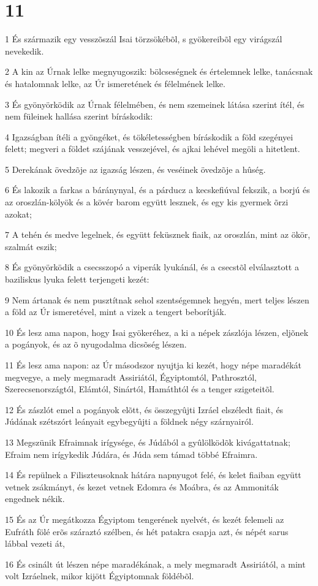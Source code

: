 \chapter{11}

\par 1 És származik egy vesszõszál Isai törzsökébõl, s gyökereibõl egy virágszál nevekedik.
\par 2 A kin az Úrnak lelke megnyugoszik: bölcseségnek és értelemnek lelke, tanácsnak és hatalomnak lelke, az Úr ismeretének és félelmének lelke.
\par 3 És gyönyörködik az Úrnak félelmében, és nem szemeinek látása szerint ítél, és nem füleinek hallása szerint bíráskodik:
\par 4 Igazságban ítéli a gyöngéket, és tökéletességben bíráskodik a föld szegényei felett; megveri a földet szájának vesszejével, és ajkai lehével megöli a hitetlent.
\par 5 Derekának övedzõje az igazság lészen, és veséinek övedzõje a hûség.
\par 6 És lakozik a farkas a báránynyal, és a párducz a kecskefiúval fekszik, a borjú és az oroszlán-kölyök és a kövér barom együtt lesznek, és egy kis gyermek õrzi azokat;
\par 7 A tehén és medve legelnek, és együtt feküsznek fiaik, az oroszlán, mint az ökör, szalmát eszik;
\par 8 És gyönyörködik a csecsszopó a viperák lyukánál, és a csecstõl elválasztott a baziliskus lyuka felett terjengeti kezét:
\par 9 Nem ártanak és nem pusztítnak sehol szentségemnek hegyén, mert teljes lészen a föld az Úr  ismeretével, mint a vizek a tengert beborítják.
\par 10 És lesz ama napon, hogy Isai gyökeréhez, a ki a népek zászlója lészen, eljõnek a pogányok, és az õ nyugodalma dicsõség lészen.
\par 11 És lesz ama napon: az Úr másodszor nyujtja ki kezét, hogy népe maradékát megvegye, a mely megmaradt Assiriától, Égyiptomtól, Pathrosztól, Szerecsenországtól, Elámtól, Sinártól, Hamáthtól és a tenger szigeteitõl.
\par 12 És zászlót emel a pogányok elõtt, és összegyûjti Izráel elszéledt fiait, és Júdának szétszórt leányait egybegyûjti a földnek négy szárnyairól.
\par 13 Megszünik Efraimnak irígysége, és Júdából a gyûlölködõk kivágattatnak; Efraim nem irígykedik Júdára, és Júda sem támad többé Efraimra.
\par 14 És repülnek a Filiszteusoknak hátára napnyugot felé, és kelet fiaiban együtt vetnek zsákmányt, és kezet vetnek Edomra és Moábra, és az Ammoniták engednek nékik.
\par 15 És az Úr megátkozza Égyiptom tengerének nyelvét, és kezét felemeli az Eufráth fölé erõs száraztó szélben, és hét patakra csapja azt, és népét sarus lábbal vezeti át,
\par 16 És csinált út lészen népe maradékának, a mely megmaradt Assiriától, a mint volt Izráelnek, mikor kijött Égyiptomnak földébõl.

